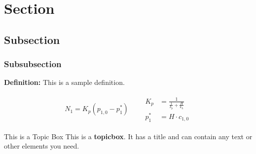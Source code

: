 \begingroup
\raggedright

\section{Section}
\subsection{Subsection}
\subsubsection{Subsubsection}

\textbf{Definition:} This is a sample definition.

\begin{formulabox}
    \begin{gather*}
    N_1 = K_p \left( p_{1,0}-p^*_{1} \right) \qquad 
    \begin{aligned}
        K_p &= \frac{1}{ \frac{1}{k_p} + \frac{H}{k_L}} \\
        p^*_{1} &= H \cdot c_{1,0}
    \end{aligned}
    \end{gather*}
\end{formulabox}

\begin{topicbox}{This is a Topic Box}
    This is a \textbf{topicbox}. It has a title and can contain any text or other elements you need.
\end{topicbox}

\endgroup